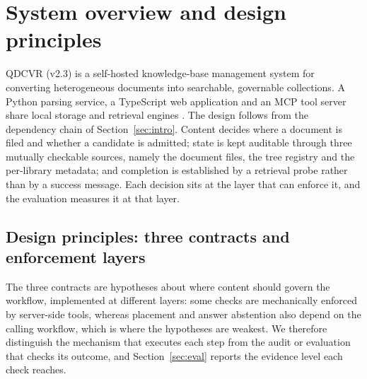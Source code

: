 \section{System overview and design principles}
\label{sec:system}

QDCVR (v2.3) is a self-hosted knowledge-base management system for converting
heterogeneous documents into searchable, governable collections. A Python
parsing service, a TypeScript web application and an MCP tool server share
local storage and retrieval engines \cite{mcp}. The design follows from the
dependency chain of Section~\ref{sec:intro}. Content decides where a document
is filed and whether a candidate is admitted; state is kept auditable through
three mutually checkable sources, namely the document files, the tree registry
and the per-library metadata; and completion is established by a retrieval
probe rather than by a success message. Each decision sits at the layer that
can enforce it, and the evaluation measures it at that layer.

\subsection{Design principles: three contracts and enforcement layers}
\label{sec:req}
\label{sec:principles}

The three contracts are hypotheses about where content should govern the
workflow, implemented at different layers: some checks are mechanically
enforced by server-side tools, whereas placement and answer abstention also
depend on the calling workflow, which is where the hypotheses are weakest. We
therefore distinguish the mechanism that executes each step from the audit or
evaluation that checks its outcome, and Section~\ref{sec:eval} reports the
evidence level each check reaches.

